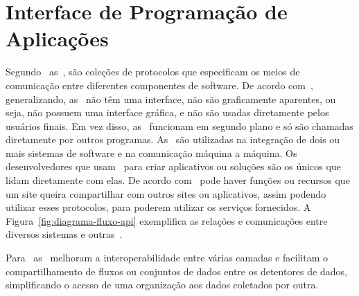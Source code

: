 \section{Interface de Programação de Aplicações}\label{sec:api}

Segundo~\textcite{borgogno2019} as~,
são coleções de protocolos que especificam os meios de comunicação
entre diferentes componentes de software.
De acordo com~\textcite{biehl2015}, generalizando, as~ não
têm uma interface, não são graficamente aparentes, ou seja, não possuem uma
interface gráfica, e não são usadas diretamente pelos usuários finais.
Em vez disso, as~ funcionam em segundo plano e só são chamadas
diretamente por outros programas.
As~ são utilizadas na integração de dois ou mais sistemas de
software e na comunicação máquina a máquina.
Os desenvolvedores que usam~ para criar aplicativos ou
soluções são os únicos que lidam diretamente com elas.
De acordo com~\textcite{russel2019} pode haver funções ou recursos que um
site queira compartilhar com outros sites ou aplicativos, assim podendo
utilizar esses protocolos, para poderem utilizar os serviços fornecidos.
A Figura~\ref{fig:diagrama-fluxo-api} exemplifica as relações e
comunicações entre diversos sistemas e outras~.

Para~\textcite{borgogno2019} as~ melhoram a
interoperabilidade entre várias camadas e facilitam o compartilhamento de
fluxos ou conjuntos de dados entre os detentores de dados, simplificando o
acesso de uma organização aos dados coletados por outra.

